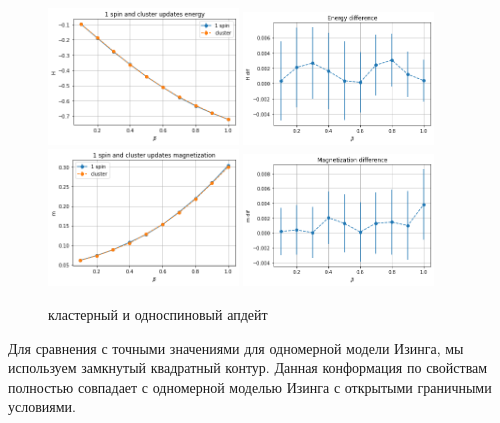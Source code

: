 \begin{figure}[H]
	\centering
	\includegraphics[width = 0.45\textwidth]{../images/1spin_&_cluster_ene.png} 
	\includegraphics[width = 0.45\textwidth]{../images/1spin_&_cluster_ene_dif.png} 
	\includegraphics[width = 0.45\textwidth]{../images/1spin_&_cluster_mag.png} 
	\includegraphics[width = 0.45\textwidth]{../images/1spin_&_cluster_mag_dif.png} 
	\caption{кластерный и односпиновый апдейт}
\end{figure}

Для сравнения с точными значениями для одномерной модели Изинга, мы используем замкнутый квадратный контур. Данная конформация по свойствам полностью совпадает с одномерной моделью Изинга с открытыми граничными условиями.

